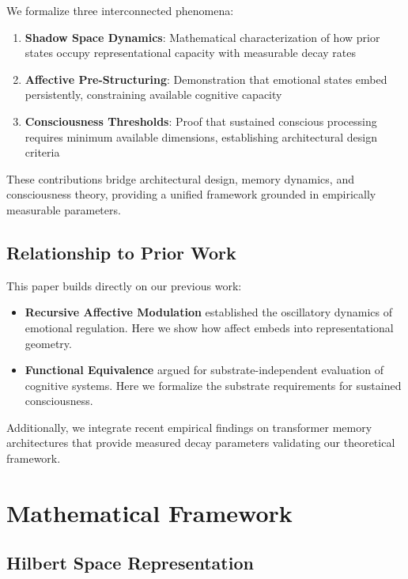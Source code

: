 \documentclass[reprint, amsmath, amssymb, aps, prd]{revtex4-2}
\begin{document}
We formalize three interconnected phenomena:

\begin{enumerate}
    \item \textbf{Shadow Space Dynamics}: Mathematical characterization of how prior states occupy representational capacity with measurable decay rates
    
    \item \textbf{Affective Pre-Structuring}: Demonstration that emotional states embed persistently, constraining available cognitive capacity
    
    \item \textbf{Consciousness Thresholds}: Proof that sustained conscious processing requires minimum available dimensions, establishing architectural design criteria
\end{enumerate}

These contributions bridge architectural design, memory dynamics, and consciousness theory, providing a unified framework grounded in empirically measurable parameters.

\subsection{Relationship to Prior Work}

This paper builds directly on our previous work:
\begin{itemize}
    \item \textbf{Recursive Affective Modulation} \cite{BennettRAM2025} established the oscillatory dynamics of emotional regulation. Here we show how affect embeds into representational geometry.
    
    \item \textbf{Functional Equivalence} \cite{BennettFE2025} argued for substrate-independent evaluation of cognitive systems. Here we formalize the substrate requirements for sustained consciousness.
\end{itemize}

Additionally, we integrate recent empirical findings on transformer memory architectures \cite{Qin2024, Zhang2024} that provide measured decay parameters validating our theoretical framework.

\section{Mathematical Framework}

\subsection{Hilbert Space Representation}
\end{document}
